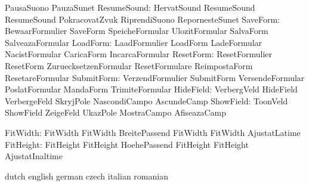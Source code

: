                            PausaSuono                PauzaSunet %
              ResumeSound: HervatSound               ResumeSound
                           ResumeSound               PokracovatZvuk
                           RiprendiSuono             RepornesteSunet %
                 SaveForm: BewaarFormulier           SaveForm
                           SpeicheFormular           UlozitFormular
                           SalvaForm                 SalveazaFormular
                 LoadForm: LaadFormulier             LoadForm
                           LadeFormular              NacistFormular
                           CaricaForm                IncarcaFormular
                ResetForm: ResetFormulier            ResetForm
                           ZuruecksetzenFormular     ResetFormulare
                           ReimpostaForm             ResetareFormular
               SubmitForm: VerzendFormulier          SubmitForm
                           VersendeFormular          PoslatFormular
                           MandaForm                 TrimiteFormular
                HideField: VerbergVeld               HideField
                           VerbergeFeld              SkryjPole
                           NascondiCampo             AscundeCamp
                ShowField: ToonVeld                  ShowField
                           ZeigeFeld                 UkazPole
                           MostraCampo               AfiseazaCamp

                 FitWidth: FitWidth                  FitWidth
                           BreitePassend             FitWidth
                           FitWidth                  AjustatLatime
                FitHeight: FitHeight                 FitHeight
                           HoehePassend              FitHeight
                           FitHeight                 AjustatInaltime

\stopvariables


\startvariables            dutch                     english
                           german                    czech
                           italian                   romanian

